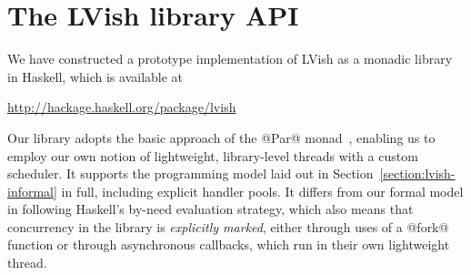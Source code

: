 \section{The LVish library API}\label{s:lvish-api}



We have constructed a prototype implementation of LVish as a monadic library in
Haskell, which is available at 
\begin{center}
\url{http://hackage.haskell.org/package/lvish}
\end{center}
%
Our library adopts the basic approach
of the @Par@ monad~\cite{monad-par}, enabling us to employ our own notion of
lightweight, library-level threads with a custom scheduler.  It supports the
programming model laid out in Section~\ref{section:lvish-informal} in full,
including explicit handler pools.  It differs from our formal model in following
Haskell's by-need evaluation strategy, which also means that concurrency in the
library is \emph{explicitly marked}, either through uses of a @fork@ function or
through asynchronous callbacks, which run in their own lightweight thread.

